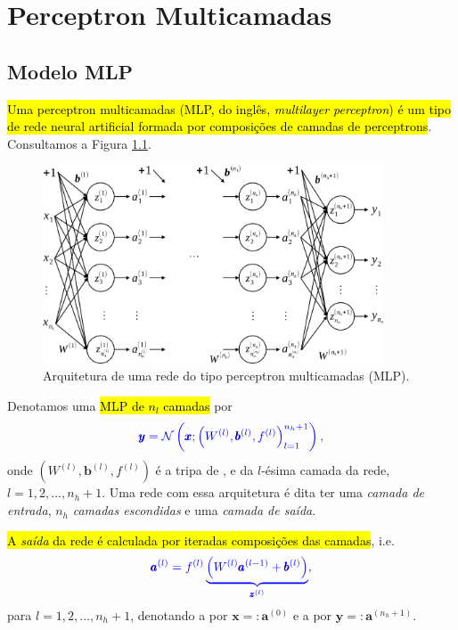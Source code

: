 

\chapter{Perceptron Multicamadas}\label{cap_mlp}
\thispagestyle{fancy}

\section{Modelo MLP}\label{cap_mlp_sec_modelo}

\hl{Uma perceptron multicamadas (MLP, do inglês, \textit{multilayer perceptron}) é um tipo de rede neural artificial formada por composições de camadas de perceptrons}. Consultamos a Figura \ref{cap_mlp_sec_modelo}.

\begin{figure}[H]
  \centering
  \includegraphics[width=0.9\textwidth]{./cap_mlp/dados/fig_mlp/fig}
  \caption{Arquitetura de uma rede do tipo perceptron multicamadas (MLP).}
  \label{fig:cap_mlp_sec_modelo:fig:mlp}
\end{figure}

Denotamos uma \hl{MLP de $n_l$ camadas} por
\begin{equation}\color{blue}\pmb{y} = \mathcal{N}\left(\pmb{x}; \left(W^{(l)}, \pmb{b}^{(l)}, f^{(l)}\right)_{l=1}^{n_h+1}\right),
\end{equation}
onde $\left(W^{(l)}, \pmb{b}^{(l)}, f^{(l)}\right)$ é a tripa de ,  e  da $l$-ésima camada da rede, $l=1, 2, \dotsc, n_h+1$. Uma rede com essa arquitetura é dita ter uma \emph{camada de entrada}, $n_h$ \emph{camadas escondidas} e uma \emph{camada de saída}.

\hl{A \emph{saída} da rede é calculada por iteradas composições das camadas}, i.e.
\begin{equation}\color{blue}\pmb{a}^{(l)} = f^{(l)}\underbrace{\left(W^{(l)}\pmb{a}^{(l-1)} + \pmb{b}^{(l)}\right)}_{\pmb{z}^{(l)}},
\end{equation}
para $l= 1, 2, \dotsc, n_h+1$, denotando a  por $\pmb{x} =: \pmb{a}^{(0)}$ e a  por $\pmb{y} =: \pmb{a}^{(n_h+1)}$.

